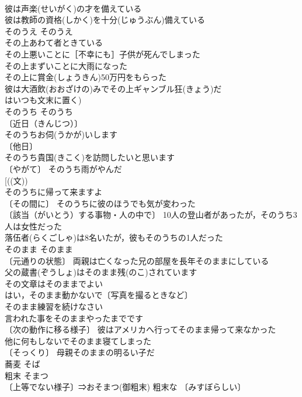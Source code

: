 \documentclass[8pt]{extreport}
\begin{document}
\begin{CJK}{UTF8}{min}
\\	彼は声楽(せいがく)の才を備えている 
\\	彼は教師の資格(しかく)を十分(じゅうぶん)備えている 
\\	そのうえ	そのうえ	
\\	その上あわて者ときている 
\\	その上悪いことに［不幸にも］子供が死んでしまった 
\\	その上まずいことに大雨になった 
\\	その上に賞金(しょうきん)50万円をもらった 
\\	彼は大酒飲(おおざけの)みでその上ギャンブル狂(きょう)だ 
\\	はいつも文末に置く)
\\	そのうち	そのうち	
\\	〔近日（きんじつ）〕　
\\	そのうちお伺(うかが)いします 
\\	〔他日〕
\\	そのうち貴国(きこく)を訪問したいと思います 
\\	〔やがて〕 そのうち雨がやんだ 
\\	[((文))
\\	そのうちに帰って来ますよ 
\\	〔その間に〕 そのうちに彼のほうでも気が変わった 
\\	〔該当（がいとう）する事物・人の中で〕 10人の登山者があったが，そのうち3人は女性だった 
\\	落伍者(らくごしゃ)は8名いたが，彼もそのうちの1人だった 
\\	そのまま	そのまま	
\\	〔元通りの状態〕 両親は亡くなった兄の部屋を長年そのままにしている 
\\	父の蔵書(ぞうしょ)はそのまま残(のこ)されています 
\\	その文章はそのままでよい 
\\	はい，そのまま動かないで〔写真を撮るときなど〕 
\\	そのまま練習を続けなさい 
\\	言われた事をそのままやったまでです 
\\	〔次の動作に移る様子〕 彼はアメリカへ行ってそのまま帰って来なかった 
\\	他に何もしないでそのまま寝てしまった 
\\	〔そっくり〕 母親そのままの明るい子だ 
\\	蕎麦	そば	
\\	粗末	そまつ	
\\	〔上等でない様子〕⇒おそまつ(御粗末) 粗末な 〔みすぼらしい〕

\end{CJK}
\end{document}
